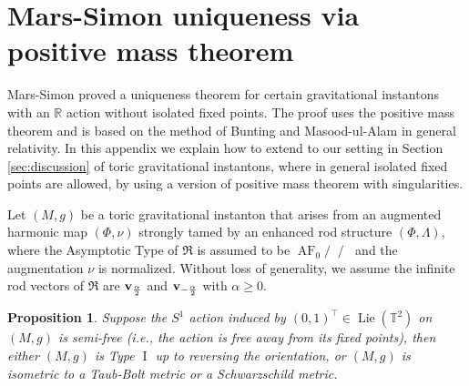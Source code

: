 \documentclass[a4paper,11pt]{amsart}
\newtheorem{proposition}[theorem]{Proposition}
\theoremstyle{definition}
\numberwithin{equation}{section}
\newcommand{\dT}{\mathbb{T}}
\newcommand{\mR} {\mathfrak R}
\DeclareMathOperator{\Lie}{Lie}
\DeclareMathOperator{\I}{I}
\DeclareMathOperator{\bv}{{\bf v}}
\DeclareMathOperator{\ALFp}{ALF^+}
\DeclareMathOperator{\ALFm}{ALF^{--}}
\DeclareMathOperator{\AF}{AF}
\begin{document}
\section{Mars-Simon uniqueness via positive mass theorem}\label{sec:appendix b}
Mars-Simon \cite{MarsSimon} proved a uniqueness theorem for certain gravitational instantons with an $\mathbb R$ action without isolated fixed points. The proof uses the positive mass theorem and is based on the method of Bunting and Masood-ul-Alam in general relativity. 
In this appendix we explain how to extend \cite{MarsSimon} to our setting in Section \ref{sec:discussion} of toric gravitational instantons, where in general isolated fixed points are allowed, by using a version of positive mass theorem with singularities. 

Let $(M,g)$ be a  toric gravitational instanton that arises from an augmented harmonic map $(\Phi,\nu)$ strongly tamed by an enhanced rod structure $(\Phi, \Lambda)$, where the Asymptotic Type of $\mR$ is assumed to be $\AF_0/\ALFp/\ALFm$ and the augmentation $\nu$ is normalized. Without loss of generality, we assume the infinite rod vectors of $\mR$ are $\bv_{\frac{\alpha}{2}}$ and $\bv_{-\frac{\alpha}{2}}$ with $\alpha\geq0$. 
\begin{proposition}\label{p:MarsSimon}
    Suppose the $S^1$ action induced by $(0,1)^\top\in \Lie(\dT^2)$ on $(M,g)$ is semi-free (i.e., the action is free away from its fixed points), then either $(M,g)$ is Type $\I$ up to reversing the orientation, or $(M,g)$ is isometric to a Taub-Bolt metric or a Schwarzschild metric.
\end{proposition}
\end{document}
